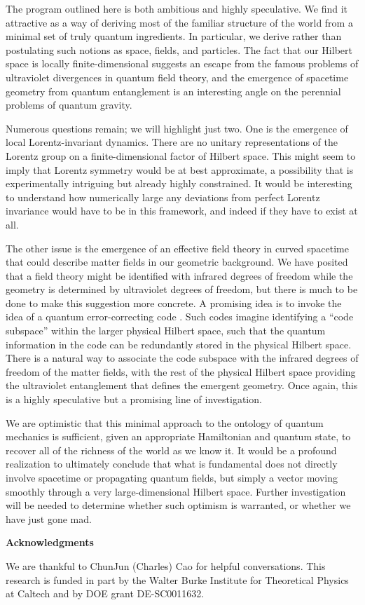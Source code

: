 \documentclass[12pt,english]{article}
\begin{document}
The program outlined here is both ambitious and highly speculative.
We find it attractive as a way of deriving most of the familiar structure of the world from a minimal set of truly quantum ingredients.
In particular, we derive rather than postulating such notions as space, fields, and particles.
The fact that our Hilbert space is locally finite-dimensional suggests an escape from the famous problems of ultraviolet divergences in quantum field theory, and the emergence of spacetime geometry from quantum entanglement is an interesting angle on the perennial problems of quantum gravity.

Numerous questions remain; we will highlight just two.
One is the emergence of local Lorentz-invariant dynamics.
There are no unitary representations of the Lorentz group on a finite-dimensional factor of Hilbert space.
This might seem to imply that Lorentz symmetry would be at best approximate, a possibility that is experimentally intriguing but already highly constrained.
It would be interesting to understand how numerically large any deviations from perfect Lorentz invariance would have to be in this framework, and indeed if they have to exist at all.

The other issue is the emergence of an effective field theory in curved spacetime that could describe matter fields in our geometric background.
We have posited that a field theory might be identified with infrared degrees of freedom while the geometry is determined by ultraviolet degrees of freedom, but there is much to be done to make this suggestion more concrete.
A promising idea is to invoke the idea of a quantum error-correcting code \cite{Harlow:2016vwg,Cao:2017hrv}.
Such codes imagine identifying a ``code subspace'' within the larger physical Hilbert space, such that the quantum information in the code can be redundantly stored in the physical Hilbert space.
There is a natural way to associate the code subspace with the infrared degrees of freedom of the matter fields, with the rest of the physical Hilbert space providing the ultraviolet entanglement that defines the emergent geometry.
Once again, this is a highly speculative but a promising line of investigation.

We are optimistic that this minimal approach to the ontology of quantum mechanics is sufficient, given an appropriate Hamiltonian and quantum state, to recover all of the richness of the world as we know it.
It would be a profound realization to ultimately conclude that what is fundamental does not directly involve spacetime or propagating quantum fields, but simply a vector moving smoothly through a very large-dimensional Hilbert space.
Further investigation will be needed to determine whether such optimism is warranted, or whether we have just gone mad.


\begin{center} 
 {\bf Acknowledgments}
 \end{center}

We are thankful to ChunJun (Charles) Cao for helpful conversations.
This research is funded in part by the Walter Burke Institute for Theoretical Physics at Caltech and by DOE grant DE-SC0011632.



\end{document}
